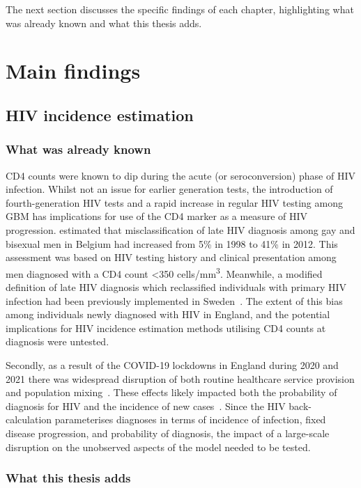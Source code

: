 The next section discusses the specific findings of each chapter, highlighting what was already known and what this thesis adds.

\section{Main findings}

\subsection{HIV incidence estimation}

\subsubsection{What was already known}

CD4 counts were known to dip during the acute (or seroconversion) phase of HIV infection. Whilst not an issue for earlier generation tests, the introduction of fourth-generation HIV tests and a rapid increase in regular HIV testing among GBM has implications for use of the CD4 marker as a measure of HIV progression. \cite{Sasse2016-gh} estimated that misclassification of late HIV diagnosis among gay and bisexual men in Belgium had increased from 5\% in 1998 to 41\% in 2012. This assessment was based on HIV testing history and clinical presentation among men diagnosed with a CD4 count <350 cells/mm\textsuperscript{3}. Meanwhile, a modified definition of late HIV diagnosis which reclassified individuals with primary HIV infection had been previously implemented in Sweden~\parencite{Brannstrom2016-nx}. The extent of this bias among individuals newly diagnosed with HIV in England, and the potential implications for HIV incidence estimation methods utilising CD4 counts at diagnosis were untested.

Secondly, as a result of the COVID-19 lockdowns in England during 2020 and 2021 there was widespread disruption of both routine healthcare service provision and population mixing~\parencite{Mude2023-ec}. These effects likely impacted both the probability of diagnosis for HIV and the incidence of new cases~\parencite{Martin2023-um}. Since the HIV back-calculation parameterises diagnoses in terms of incidence of infection, fixed disease progression, and probability of diagnosis, the impact of a large-scale disruption on the unobserved aspects of the model needed to be tested.

\subsubsection{What this thesis adds}

